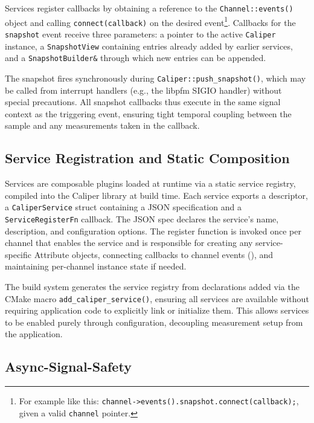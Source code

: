 Services register callbacks by obtaining a reference to the \texttt{Channel::events()} object and calling \texttt{connect(callback)} on the desired event\footnote{For example like this: \texttt{channel->events().snapshot.connect(callback);}, given a valid \texttt{channel} pointer.}. Callbacks for the \texttt{snapshot} event receive three parameters: a pointer to the active \texttt{Caliper} instance, a \texttt{SnapshotView} containing entries already added by earlier services, and a \texttt{SnapshotBuilder\&} through which new entries can be appended.\cite{CaliperGh}

The snapshot fires synchronously during \texttt{Caliper::push\_snapshot()}, which may be called from interrupt handlers (e.g., the libpfm SIGIO handler) without special precautions. All snapshot callbacks thus execute in the same signal context as the triggering event, ensuring tight temporal coupling between the sample and any measurements taken in the callback.\cite{CaliperGh}

\subsection{Service Registration and Static Composition}
\label{subsec:cali-service-registration}

Services are composable plugins loaded at runtime via a static service registry, compiled into the Caliper library at build time. Each service exports a descriptor, a \texttt{CaliperService} struct containing a JSON specification and a \texttt{ServiceRegisterFn} callback. The JSON spec declares the service's name, description, and configuration options. The register function is invoked once per channel that enables the service and is responsible for creating any service-specific Attribute objects, connecting callbacks to channel events (), and maintaining per-channel instance state if needed.\cite{CaliperGh}

The build system generates the service registry from declarations added via the CMake macro \texttt{add\_caliper\_service()}, ensuring all services are available without requiring application code to explicitly link or initialize them. This allows services to be enabled purely through configuration, decoupling measurement setup from the application.\cite{CaliperGh}

\subsection{Async-Signal-Safety}
\label{subsec:cali-signal-safety}

